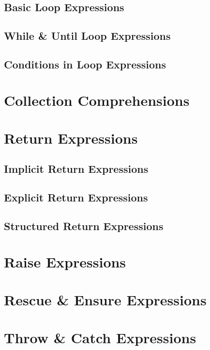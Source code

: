 \subsection{Basic Loop Expressions}

\subsection{While \& Until Loop Expressions}

\subsection{Conditions in Loop Expressions}

\section{Collection Comprehensions}

\section{Return Expressions}

\subsection{Implicit Return Expressions}

\subsection{Explicit Return Expressions}

\subsection{Structured Return Expressions}

\section{Raise Expressions}

\section{Rescue \& Ensure Expressions}

\section{Throw \& Catch Expressions}

